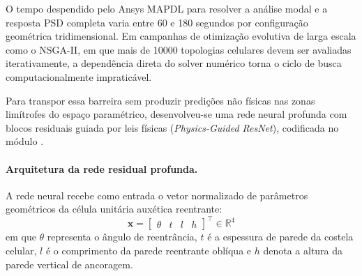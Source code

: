 O tempo despendido pelo Ansys MAPDL para resolver a análise modal e a resposta PSD completa varia entre 60 e 180 segundos por configuração geométrica tridimensional. Em campanhas de otimização evolutiva de larga escala como o NSGA-II, em que mais de \num{10000} topologias celulares devem ser avaliadas iterativamente, a dependência direta do solver numérico torna o ciclo de busca computacionalmente impraticável.

Para transpor essa barreira sem produzir predições não físicas nas zonas limítrofes do espaço paramétrico, desenvolveu-se uma rede neural profunda com blocos residuais guiada por leis físicas (\textit{Physics-Guided ResNet}), codificada no módulo .

\paragraph*{Arquitetura da rede residual profunda.}
\label{par:arquitetura}
A rede neural recebe como entrada o vetor normalizado de parâmetros geométricos da célula unitária auxética reentrante:
\begin{equation}
  \mathbf{x} = \begin{bmatrix} \theta & t & l & h \end{bmatrix}^{\top} \in \mathbb{R}^{4}
  \label{eq:entrada}
\end{equation}
em que $\theta$ representa o ângulo de reentrância, $t$ é a espessura de parede da costela celular, $l$ é o comprimento da parede reentrante oblíqua e $h$ denota a altura da parede vertical de ancoragem.

